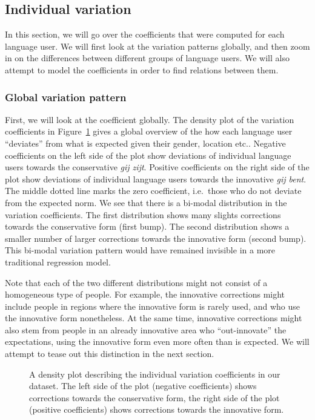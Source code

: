 \documentclass[
  letterpaper,
  DIV=11,
  numbers=noendperiod,
  oneside]{scrartcl}
\begin{document}
\subsection{Individual variation}\label{individual-variation}

In this section, we will go over the coefficients that were computed for
each language user. We will first look at the variation patterns
globally, and then zoom in on the differences between different groups
of language users. We will also attempt to model the coefficients in
order to find relations between them.

\subsubsection{Global variation pattern}\label{global-variation-pattern}

First, we will look at the coefficient globally. The density plot of the
variation coefficients in Figure~\ref{fig-general-density} gives a
global overview of the how each language user ``deviates'' from what is
expected given their gender, location etc.. Negative coefficients on the
left side of the plot show deviations of individual language users
towards the conservative \emph{gij zijt}. Positive coefficients on the
right side of the plot show deviations of individual language users
towards the innovative \emph{gij bent}. The middle dotted line marks the
zero coefficient, i.e.~those who do not deviate from the expected norm.
We see that there is a bi-modal distribution in the variation
coefficients. The first distribution shows many slights corrections
towards the conservative form (first bump). The second distribution
shows a smaller number of larger corrections towards the innovative form
(second bump). This bi-modal variation pattern would have remained
invisible in a more traditional regression model.

Note that each of the two different distributions might not consist of a
homogeneous type of people. For example, the innovative corrections
might include people in regions where the innovative form is rarely
used, and who use the innovative form nonetheless. At the same time,
innovative corrections might also stem from people in an already
innovative area who ``out-innovate'' the expectations, using the
innovative form even more often than is expected. We will attempt to
tease out this distinction in the next section.

\begin{figure}


\caption{\label{fig-general-density}A density plot describing the
individual variation coefficients in our dataset. The left side of the
plot (negative coefficients) shows corrections towards the conservative
form, the right side of the plot (positive coefficients) shows
corrections towards the innovative form.}

\end{figure}%
\end{document}
